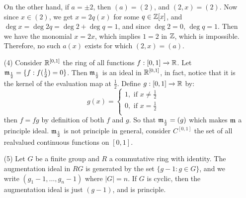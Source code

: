 \begin{example}
\begin{enumerate}
      On the other hand, if $a=\pm{2}$, then $(a)=(2)$, and
      $(2,x)=(2)$. Now since $x \in (2)$, we get $x=2q(x)$ for some $q
      \in \mathbb{Z}[x]$, and $\deg{x}=\deg{2q}=\deg{2}+\deg{q}=1$, and since
      $\deg{2}=0$, $\deg{q}=1$. Then we have the monomial $x=2x$,
      which implies $1=2$ in $\mathbb{Z}$, which is impossible. Therefore, no
      such $a(x)$ exists for which $(2,x)=(a)$.

    \item[(4)] Consider $\mathbb{R}^{[0,1]}$ the ring of all functions $f:[0,1]
      \xrightarrow{} \mathbb{R}$. Let $\mathfrak{m}_\frac{1}{2}=\{f : f(\frac{1}{2})=0\}$. Then
      $\mathfrak{m}_\frac{1}{2}$ is an ideal in $\mathbb{R}^{[0,1]}$, in fact, notice
      that it is the kernel of the evaluation map at $\frac{1}{2}$.
      Define $g:[0,1] \xrightarrow{} \mathbb{R}$ by:
      \begin{equation*}
        g(x)=\begin{cases}
          1, \text{ if } x \neq \frac{1}{2}  \\
          0, \text{ if } x=\frac{1}{2}   \\
        \end{cases}
      \end{equation*}
      then $f=fg$ by definition of both  $f$ and $g$. So that
      $\mathfrak{m}_\frac{1}{2}=(g)$ which makes $\mathfrak{m}$ a principle ideal.
      $\mathfrak{m}_\frac{1}{2}$ is not principle in general, consider
      $C^{[0,1]}$ the set of all realvalued continuous functions on
      $[0,1]$.

    \item[(5)] Let $G$ be a finite group and  $R$ a commutative ring with
      identity. The augmentation ideal in $RG$ is generated by the set
      $\{g-1 : g \in G\}$, and we write $(g_1-1, \dots, g_n-1)$ where
      $|G|=n$. If $G$ is cyclic, then the augmentation ideal is just
      $(g-1)$, and is principle.
  \end{enumerate}
\end{example}

